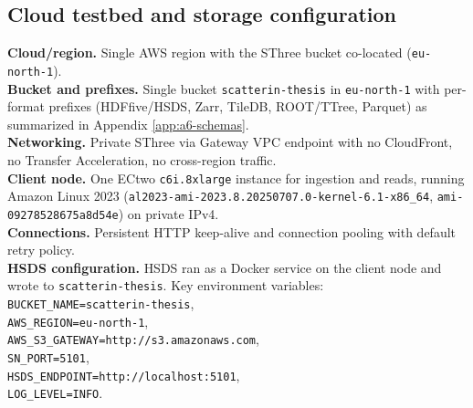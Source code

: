 \documentclass[nomenclature, english, bibtex]{kththesis}
\numberwithin{listing}{chapter}
\begin{document}
\subsection{Cloud testbed and storage configuration}
\label{app:a1-testbed}
\textbf{Cloud/region.} Single \gls{AWS} region with the \gls{SThree} bucket co-located (\texttt{eu-north-1}).\\
\textbf{Bucket and prefixes.} Single bucket \texttt{scatterin-thesis} in \texttt{eu-north-1} with per-format prefixes (\gls{HDFfive}/\gls{HSDS}, Zarr, TileDB, \gls{ROOT}/\gls{TTree}, Parquet) as summarized in Appendix \ref{app:a6-schemas}.\\
\textbf{Networking.} Private \gls{SThree} via Gateway VPC endpoint with no CloudFront, no Transfer Acceleration, no cross-region traffic.\\
\textbf{Client node.} One \gls{ECtwo} \texttt{c6i.8xlarge} instance for ingestion and reads, running Amazon Linux 2023 (\texttt{al2023-ami-2023.8.20250707.0-kernel-6.1-x86\_64}, \texttt{ami-09278528675a8d54e}) on private IPv4.\\
\textbf{Connections.} Persistent \gls{HTTP} keep-alive and connection pooling with default retry policy.\\
\textbf{\gls{HSDS} configuration.} \gls{HSDS} ran as a Docker service on the client node and wrote to \texttt{scatterin-thesis}. Key environment variables: \texttt{BUCKET\_NAME=scatterin-thesis},\\ \texttt{AWS\_REGION=eu-north-1},\\ \texttt{AWS\_S3\_GATEWAY=http://s3.amazonaws.com},\\ \texttt{SN\_PORT=5101},\\ \texttt{HSDS\_ENDPOINT=http://localhost:5101},\\ \texttt{LOG\_LEVEL=INFO}.
\end{document}

